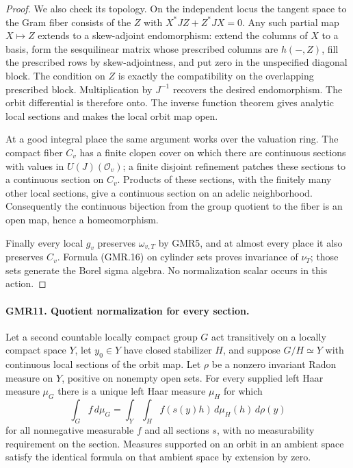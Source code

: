 \documentclass[11pt,a4paper]{article}
\numberwithin{equation}{section}
\theoremstyle{remark}\newtheorem{remark}[theorem]{Remark}
\begin{document}
\begin{proof}
We also check its topology.  On the independent locus the tangent
space to the Gram fiber consists of the $Z$ with
$X^*JZ+Z^*JX=0$.  Any such partial map $X\mapsto Z$ extends to a
skew-adjoint endomorphism: extend the columns of $X$ to a basis, form
the sesquilinear matrix whose prescribed columns are
$h(-,Z)$, fill the prescribed rows by skew-adjointness, and put zero
in the unspecified diagonal block.  The condition on $Z$ is exactly
the compatibility on the overlapping prescribed block.  Multiplication
by $J^{-1}$ recovers the desired endomorphism.  The orbit differential
is therefore onto.  The inverse function theorem gives analytic local
sections and makes the local orbit map open.

At a good integral place the same argument works over the valuation
ring.  The compact fiber $C_v$ has a finite clopen cover on which there
are continuous sections with values in $U(J)(\mathcal O_v)$; a finite
disjoint refinement patches these sections to a continuous section
on $C_v$.  Products of these sections, with the finitely many other
local sections, give a continuous section on an adelic neighborhood.
Consequently the continuous bijection from the group quotient to
the fiber is an open map, hence a homeomorphism.

Finally every local $g_v$ preserves $\omega_{v,T}$ by GMR5, and at
almost every place it also preserves $C_v$.  Formula (GMR.16) on
cylinder sets proves invariance of $\nu_T$; those sets generate the
Borel sigma algebra.  No normalization scalar occurs in this action.
\end{proof}

\paragraph{GMR11. Quotient normalization for every section.}
\label{claim:GMR11}
Let a second countable locally compact group $G$ act transitively on
a locally compact space $Y$, let $y_0\in Y$ have closed stabilizer $H$,
and suppose $G/H\simeq Y$ with continuous local sections of the orbit
map.  Let $\rho$ be a nonzero invariant Radon measure on $Y$, positive
on nonempty open sets.  For every supplied left Haar measure $\mu_G$
there is a unique left Haar measure $\mu_H$ for which
\[
 \int_G f\,d\mu_G
   =\int_Y\int_H f(s(y)h)\,d\mu_H(h)\,d\rho(y)
 \tag{GMR.19}
\]
for all nonnegative measurable $f$ and all sections $s$, with no
measurability requirement on the section.  Measures supported on an
orbit in an ambient space satisfy the identical formula on that
ambient space by extension by zero.
\end{document}
